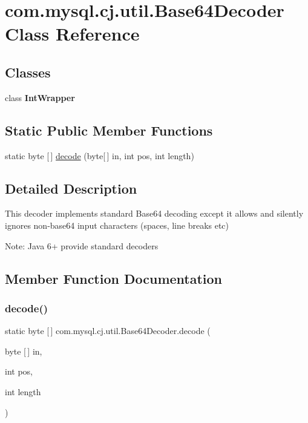 \hypertarget{classcom_1_1mysql_1_1cj_1_1util_1_1_base64_decoder}{}\section{com.\+mysql.\+cj.\+util.\+Base64\+Decoder Class Reference}
\label{classcom_1_1mysql_1_1cj_1_1util_1_1_base64_decoder}
\subsection*{Classes}
\begin{DoxyCompactItemize}
\item 
class {\bfseries Int\+Wrapper}
\end{DoxyCompactItemize}
\subsection*{Static Public Member Functions}
\begin{DoxyCompactItemize}
\item 
static byte \mbox{[}$\,$\mbox{]} \mbox{\hyperlink{classcom_1_1mysql_1_1cj_1_1util_1_1_base64_decoder_aafbcacd62566530b7319f2b2dce34b8c}{decode}} (byte\mbox{[}$\,$\mbox{]} in, int pos, int length)
\end{DoxyCompactItemize}


\subsection{Detailed Description}
This decoder implements standard Base64 decoding except it allows and silently ignores non-\/base64 input characters (spaces, line breaks etc)

Note\+: Java 6+ provide standard decoders 

\subsection{Member Function Documentation}
\mbox{\label{classcom_1_1mysql_1_1cj_1_1util_1_1_base64_decoder_aafbcacd62566530b7319f2b2dce34b8c}} 
\subsubsection{\texorpdfstring{decode()}{decode()}}
{\footnotesize\ttfamily static byte \mbox{[}$\,$\mbox{]} com.\+mysql.\+cj.\+util.\+Base64\+Decoder.\+decode (\begin{DoxyParamCaption}\item[{byte \mbox{[}$\,$\mbox{]}}]{in,  }\item[{int}]{pos,  }\item[{int}]{length }\end{DoxyParamCaption})\hspace{0.3cm}{\ttfamily [static]}}



